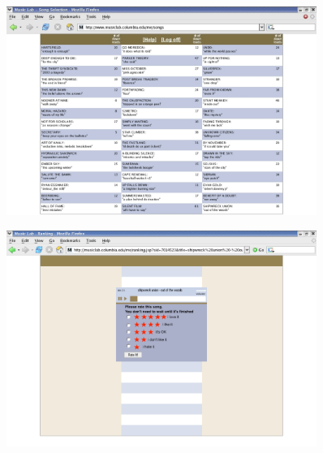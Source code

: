 \documentclass[aspectratio=169]{beamer}
\begin{document}
\begin{frame}

\begin{figure}
  \centering
  \includegraphics[width = 0.9\textwidth]{figures/info-v1-cut}
\end{figure}

\end{frame}
\begin{frame} 

\begin{figure}
  \centering
  \includegraphics[width = 0.9\textwidth]{figures/listenscreen}
\end{figure}

\end{frame}
\end{document}
